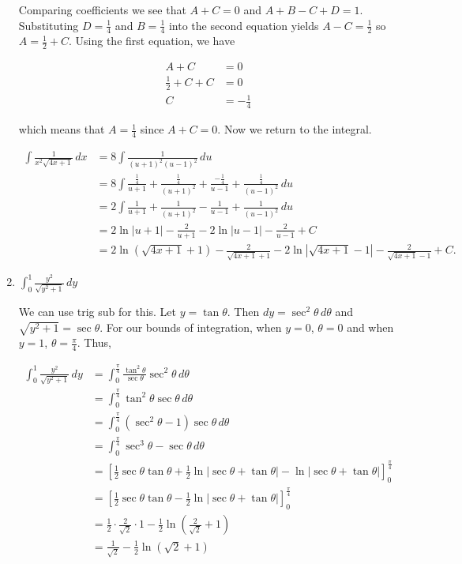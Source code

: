 \documentclass[12pt,oneside,english]{amsart}
\begin{document}
\begin{enumerate}[leftmargin=*]
Comparing coefficients we see that $A+C=0$ and $A+B-C+D=1$. Substituting $D=\frac{1}{4}$ and $B=\frac{1}{4}$ into the second equation yields $A-C=\frac{1}{2}$ so $A=\frac{1}{2}+C$. Using the first equation, we have

\begin{align*}
A+C&=0 \\
\frac{1}{2}+C+C&=0 \\
C&=-\frac{1}{4}
\end{align*}

which means that $A=\frac{1}{4}$ since $A+C=0$. Now we return to the integral.

\begin{align*}
\int\frac{1}{x^2\sqrt{4x+1}}\,dx&=8\int\frac{1}{(u+1)^2(u-1)^2}\,du \\
&=8\int\frac{\frac{1}{4}}{u+1}+\frac{\frac{1}{4}}{(u+1)^2}+\frac{-\frac{1}{4}}{u-1}+\frac{\frac{1}{4}}{(u-1)^2}\,du \\
&=2\int\frac{1}{u+1}+\frac{1}{(u+1)^2}-\frac{1}{u-1}+\frac{1}{(u-1)^2}\,du \\
&=2\ln|u+1|-\frac{2}{u+1}-2\ln|u-1|-\frac{2}{u-1}+C \\
&=2\ln(\sqrt{4x+1}+1)-\frac{2}{\sqrt{4x+1}+1}-2\ln|\sqrt{4x+1}-1|-\frac{2}{\sqrt{4x+1}-1}+C.
\end{align*}

\item $\displaystyle \int_0^1\frac{y^2}{\sqrt{y^2+1}}\,dy$

We can use trig sub for this. Let $y=\tan\theta$. Then $dy=\sec^2\theta\,d\theta$ and $\sqrt{y^2+1}=\sec\theta$. For our bounds of integration, when $y=0$, $\theta=0$ and when $y=1$, $\theta=\frac{\pi}{4}$. Thus,

\begin{align*}
\int_0^1\frac{y^2}{\sqrt{y^2+1}}\,dy&=\int_0^\frac{\pi}{4}\frac{\tan^2\theta}{\sec\theta}\sec^2\theta\,d\theta \\
&=\int_0^\frac{\pi}{4}\tan^2\theta\sec\theta\,d\theta \\
&=\int_0^\frac{\pi}{4}(\sec^2\theta-1)\sec\theta\,d\theta \\
&=\int_0^\frac{\pi}{4}\sec^3\theta-\sec\theta \,d\theta \\
&=\left[\frac{1}{2}\sec\theta\tan\theta+\frac{1}{2}\ln|\sec\theta+\tan\theta|-\ln|\sec\theta+\tan\theta|\right]_0^\frac{\pi}{4} \\
&=\left[\frac{1}{2}\sec\theta\tan\theta-\frac{1}{2}\ln|\sec\theta+\tan\theta|\right]_0^\frac{\pi}{4} \\
&=\frac{1}{2}\cdot\frac{2}{\sqrt{2}}\cdot1-\frac{1}{2}\ln\left(\frac{2}{\sqrt{2}}+1\right) \\
&=\frac{1}{\sqrt{2}}-\frac{1}{2}\ln(\sqrt{2}+1)
\end{align*}



\end{enumerate}
\end{document}
